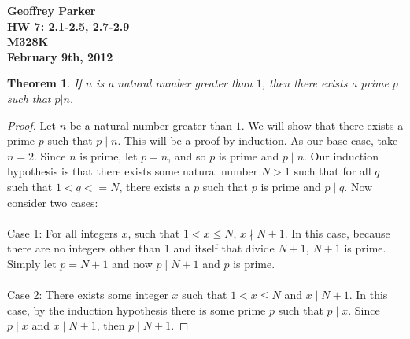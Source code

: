 \documentclass[12pt,leqno]{article}
\numberwithin{equation}{section}
\newtheorem{thm}{Theorem}[section]
\theoremstyle{definition}
\begin{document}
\thispagestyle{plain}
\begin{flushright}
\large{\textbf{Geoffrey Parker \\
HW 7: 2.1-2.5, 2.7-2.9\\
M328K \\
February 9th, 2012 \\}}
\end{flushright}

\markboth{}{} \setcounter{section}{0} \baselineskip=18pt

\setcounter{tocdepth}{4}



\setcounter{section}{2}

\setcounter{thm}{0}

\begin{thm}
If $n$ is a natural number greater than $1$, then there exists a
prime $p$ such that $p|n$.
\end{thm}

\begin{proof}[Proof]
Let $n$ be a natural number greater than $1$.  We will show that there exists a prime $p$ such that $p \mid n$.  This will be a proof by induction.  As our base case, take $n = 2$.  Since $n$ is prime, let $p = n$, and so $p$ is prime and $p \mid n$.  Our induction hypothesis is that there exists some natural number $N > 1$ such that for all $q$ such that $1 < q <= N$, there exists a $p$ such that $p$ is prime and $p \mid q$.  Now consider two cases:\\
\\
Case 1: For all integers $x$, such that $1 < x \leq N$, $x \nmid N+1$.  In this case, because there are no integers other than 1 and itself that divide $N+1$, $N+1$ is prime.  Simply let $p = N+1$ and now $p \mid N+1$ and $p$ is prime.\\
\\
Case 2: There exists some integer $x$ such that $1 < x \leq N$ and $x \mid N+1$.  In this case, by the induction hypothesis there is some prime $p$ such that $p \mid x$.  Since $p \mid x$ and $x \mid N+1$, then $p \mid N+1$.
\end{proof}
\end{document}

